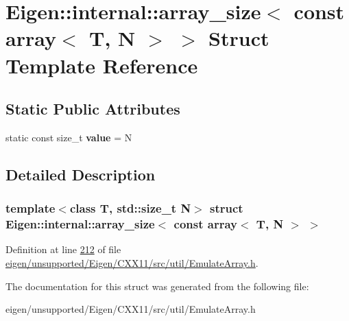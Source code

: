 \hypertarget{struct_eigen_1_1internal_1_1array__size_3_01const_01array_3_01_t_00_01_n_01_4_01_4}{}\section{Eigen\+:\+:internal\+:\+:array\+\_\+size$<$ const array$<$ T, N $>$ $>$ Struct Template Reference}
\label{struct_eigen_1_1internal_1_1array__size_3_01const_01array_3_01_t_00_01_n_01_4_01_4}
\subsection*{Static Public Attributes}
\begin{DoxyCompactItemize}
\item 
\mbox{\label{struct_eigen_1_1internal_1_1array__size_3_01const_01array_3_01_t_00_01_n_01_4_01_4_a7f70299ce829bd031cc9f587749c8ba6}} 
static const size\+\_\+t {\bfseries value} = N
\end{DoxyCompactItemize}


\subsection{Detailed Description}
\subsubsection*{template$<$class T, std\+::size\+\_\+t N$>$\newline
struct Eigen\+::internal\+::array\+\_\+size$<$ const array$<$ T, N $>$ $>$}



Definition at line \hyperlink{eigen_2unsupported_2_eigen_2_c_x_x11_2src_2util_2_emulate_array_8h_source_l00212}{212} of file \hyperlink{eigen_2unsupported_2_eigen_2_c_x_x11_2src_2util_2_emulate_array_8h_source}{eigen/unsupported/\+Eigen/\+C\+X\+X11/src/util/\+Emulate\+Array.\+h}.



The documentation for this struct was generated from the following file\+:\begin{DoxyCompactItemize}
\item 
eigen/unsupported/\+Eigen/\+C\+X\+X11/src/util/\+Emulate\+Array.\+h\end{DoxyCompactItemize}
